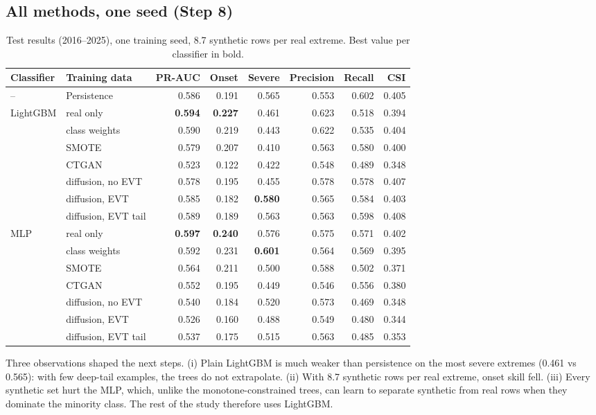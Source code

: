 \documentclass[11pt,a4paper]{article}
\newcommand{\win}[1]{\textbf{#1}}
\begin{document}
\subsection{All methods, one seed (Step 8)}
\begin{table}[H]
\centering\small
\caption{Test results (2016--2025), one training seed, 8.7 synthetic rows per real extreme. Best value per
classifier in bold.}\label{tab:step8}
\begin{tabular}{@{}llrrrrrr@{}}
\toprule
Classifier & Training data & PR-AUC & Onset & Severe & Precision & Recall & CSI\\
\midrule
-- & Persistence & 0.586 & 0.191 & 0.565 & 0.553 & 0.602 & 0.405\\
\midrule
LightGBM & real only & \win{0.594} & \win{0.227} & 0.461 & 0.623 & 0.518 & 0.394\\
 & class weights & 0.590 & 0.219 & 0.443 & 0.622 & 0.535 & 0.404\\
 & SMOTE & 0.579 & 0.207 & 0.410 & 0.563 & 0.580 & 0.400\\
 & CTGAN & 0.523 & 0.122 & 0.422 & 0.548 & 0.489 & 0.348\\
 & diffusion, no EVT & 0.578 & 0.195 & 0.455 & 0.578 & 0.578 & 0.407\\
 & diffusion, EVT & 0.585 & 0.182 & \win{0.580} & 0.565 & 0.584 & 0.403\\
 & diffusion, EVT tail & 0.589 & 0.189 & 0.563 & 0.563 & 0.598 & 0.408\\
\midrule
MLP & real only & \win{0.597} & \win{0.240} & 0.576 & 0.575 & 0.571 & 0.402\\
 & class weights & 0.592 & 0.231 & \win{0.601} & 0.564 & 0.569 & 0.395\\
 & SMOTE & 0.564 & 0.211 & 0.500 & 0.588 & 0.502 & 0.371\\
 & CTGAN & 0.552 & 0.195 & 0.449 & 0.546 & 0.556 & 0.380\\
 & diffusion, no EVT & 0.540 & 0.184 & 0.520 & 0.573 & 0.469 & 0.348\\
 & diffusion, EVT & 0.526 & 0.160 & 0.488 & 0.549 & 0.480 & 0.344\\
 & diffusion, EVT tail & 0.537 & 0.175 & 0.515 & 0.563 & 0.485 & 0.353\\
\bottomrule
\end{tabular}
\end{table}

Three observations shaped the next steps. (i) Plain LightGBM is much weaker than persistence on the most
severe extremes (0.461 vs 0.565): with few deep-tail examples, the trees do not extrapolate. (ii) With 8.7
synthetic rows per real extreme, onset skill fell. (iii) Every synthetic set hurt the MLP, which, unlike the
monotone-constrained trees, can learn to separate synthetic from real rows when they dominate the minority
class. The rest of the study therefore uses LightGBM.
\end{document}
